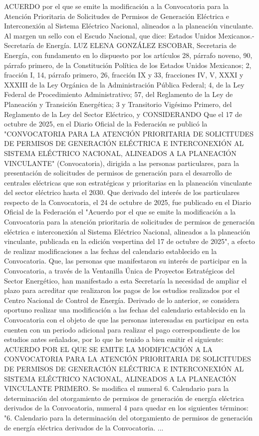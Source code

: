 \begingroup
\senertexto
ACUERDO por el que se emite la modificación a la Convocatoria para la Atención Prioritaria de Solicitudes de Permisos de Generación Eléctrica e Interconexión al Sistema Eléctrico Nacional, alineados a la planeación vinculante.
Al margen un sello con el Escudo Nacional, que dice: Estados Unidos Mexicanos.- Secretaría de Energía.
LUZ ELENA GONZÁLEZ ESCOBAR, Secretaria de Energía, con fundamento en lo dispuesto por los artículos 28, párrafo noveno, 90, párrafo primero, de la Constitución Política de los Estados Unidos Mexicanos; 2, fracción I, 14, párrafo primero, 26, fracción IX y 33, fracciones IV, V, XXXI y XXXIII de la Ley Orgánica de la Administración Pública Federal; 4, de la Ley Federal de Procedimiento Administrativo; 57, del Reglamento de la Ley de Planeación y Transición Energética; 3 y Transitorio Vigésimo Primero,  del Reglamento de la Ley del Sector Eléctrico, y
CONSIDERANDO
Que el 17 de octubre de 2025, en el Diario Oficial de la Federación se publicó la "CONVOCATORIA PARA LA ATENCIÓN PRIORITARIA DE SOLICITUDES DE PERMISOS DE GENERACIÓN ELÉCTRICA E INTERCONEXIÓN AL SISTEMA ELÉCTRICO NACIONAL, ALINEADOS A LA PLANEACIÓN VINCULANTE" (Convocatoria), dirigida a las personas particulares, para la presentación de solicitudes de permisos de generación para el desarrollo de centrales eléctricas que son estratégicas y prioritarias en la planeación vinculante del sector eléctrico hasta el 2030.
Que derivado del interés de los particulares respecto de la Convocatoria, el 24 de octubre de 2025, fue publicado en el Diario Oficial de la Federación el "Acuerdo por el que se emite la modificación a la Convocatoria para la atención prioritaria de solicitudes de permisos de generación eléctrica e interconexión al Sistema Eléctrico Nacional, alineados a la planeación vinculante, publicada en la edición vespertina del 17 de octubre de 2025", a efecto de realizar modificaciones a las fechas del calendario establecido en la Convocatoria.
Que, las personas que manifestaron su interés de participar en la Convocatoria, a través de la Ventanilla Única de Proyectos Estratégicos del Sector Energético, han manifestado a esta Secretaría la necesidad de ampliar el plazo para acreditar que realizaron los pagos de los estudios realizados por el Centro Nacional  de Control de Energía.
Derivado de lo anterior, se considera oportuno realizar una modificación a las fechas del calendario establecido en la Convocatoria con el objeto de que las personas interesadas en participar en esta cuenten con un periodo adicional para realizar el pago correspondiente de los estudios antes señalados, por lo que he tenido a bien emitir el siguiente:
ACUERDO POR EL QUE SE EMITE LA MODIFICACIÓN A LA CONVOCATORIA PARA LA ATENCIÓN PRIORITARIA DE SOLICITUDES DE PERMISOS DE GENERACIÓN ELÉCTRICA E INTERCONEXIÓN AL SISTEMA ELÉCTRICO NACIONAL, ALINEADOS A LA PLANEACIÓN VINCULANTE
PRIMERO. Se modifica el numeral 6. Calendario para la determinación del otorgamiento de permisos de generación de energía eléctrica derivados de la Convocatoria, numeral 4 para quedar en los siguientes términos: 
"6. Calendario para la determinación del otorgamiento de permisos de generación de energía eléctrica derivados de la Convocatoria.
...

